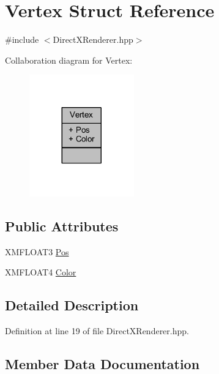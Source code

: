 \hypertarget{struct_vertex}{}\section{Vertex Struct Reference}
\label{struct_vertex}


{\ttfamily \#include $<$Direct\+X\+Renderer.\+hpp$>$}



Collaboration diagram for Vertex\+:\nopagebreak
\begin{figure}[H]
\begin{center}
\leavevmode
\includegraphics[width=128pt]{struct_vertex__coll__graph}
\end{center}
\end{figure}
\subsection*{Public Attributes}
\begin{DoxyCompactItemize}
\item 
X\+M\+F\+L\+O\+A\+T3 \hyperlink{struct_vertex_aaf88f17802e68e25a6ecca0ecb2b2795_aaf88f17802e68e25a6ecca0ecb2b2795}{Pos}
\item 
X\+M\+F\+L\+O\+A\+T4 \hyperlink{struct_vertex_a18d71d2fe13d3e9239fba3a89e194a1f_a18d71d2fe13d3e9239fba3a89e194a1f}{Color}
\end{DoxyCompactItemize}


\subsection{Detailed Description}


Definition at line 19 of file Direct\+X\+Renderer.\+hpp.



\subsection{Member Data Documentation}
